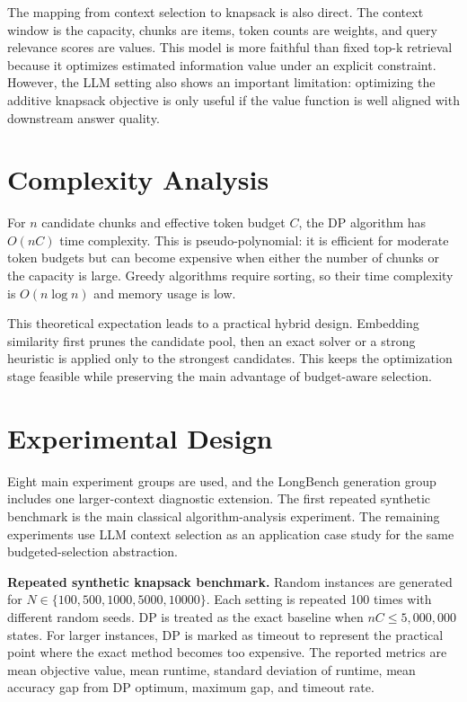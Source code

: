 \documentclass[conference]{IEEEtran}
\begin{document}
The mapping from context selection to knapsack is also direct. The context window is the capacity, chunks are items, token counts are weights, and query relevance scores are values. This model is more faithful than fixed top-k retrieval because it optimizes estimated information value under an explicit constraint. However, the LLM setting also shows an important limitation: optimizing the additive knapsack objective is only useful if the value function is well aligned with downstream answer quality.

\section{Complexity Analysis}
For $n$ candidate chunks and effective token budget $C$, the DP algorithm has $O(nC)$ time complexity. This is pseudo-polynomial: it is efficient for moderate token budgets but can become expensive when either the number of chunks or the capacity is large. Greedy algorithms require sorting, so their time complexity is $O(n \log n)$ and memory usage is low.

This theoretical expectation leads to a practical hybrid design. Embedding similarity first prunes the candidate pool, then an exact solver or a strong heuristic is applied only to the strongest candidates. This keeps the optimization stage feasible while preserving the main advantage of budget-aware selection.

\section{Experimental Design}
Eight main experiment groups are used, and the LongBench generation group includes one larger-context diagnostic extension. The first repeated synthetic benchmark is the main classical algorithm-analysis experiment. The remaining experiments use LLM context selection as an application case study for the same budgeted-selection abstraction.

\textbf{Repeated synthetic knapsack benchmark.} Random instances are generated for $N \in \{100,500,1000,5000,10000\}$. Each setting is repeated 100 times with different random seeds. DP is treated as the exact baseline when $nC \leq 5{,}000{,}000$ states. For larger instances, DP is marked as timeout to represent the practical point where the exact method becomes too expensive. The reported metrics are mean objective value, mean runtime, standard deviation of runtime, mean accuracy gap from DP optimum, maximum gap, and timeout rate.
\end{document}
